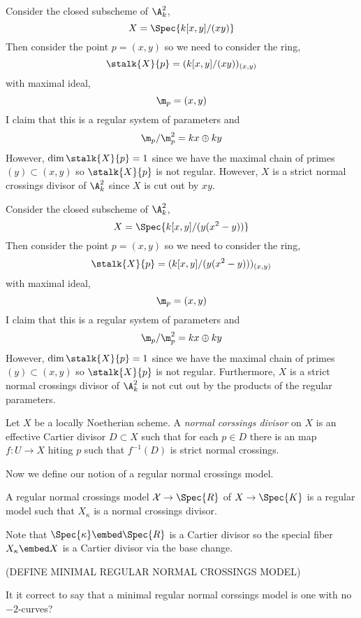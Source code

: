 \begin{example}
Consider the closed subscheme of $\A^2_k$,
\[ X = \Spec{k[x, y]/(xy)} \]
Then consider the point $p = (x, y)$ so we need to consider the ring,
\[ \stalk{X}{p} = (k[x, y]/(xy))_{(x, y)} \]
with maximal ideal,
\[ \m_p = (x, y) \]
I claim that this is a regular system of parameters and
\[ \m_p / \m_p^2 = k x \oplus k y \] 
However, $\dim{\stalk{X}{p}} = 1$ since we have the maximal chain of primes $(y) \subset (x, y)$ so $\stalk{X}{p}$ is not regular. However, $X$ is a strict normal crossings divisor of $\A^2_k$ since $X$ is cut out by $xy$. 
\end{example}

\begin{example}
Consider the closed subscheme of $\A^2_k$,
\[ X = \Spec{k[x, y]/(y(x^2 - y))} \]
Then consider the point $p = (x, y)$ so we need to consider the ring,
\[ \stalk{X}{p} = (k[x, y]/(y(x^2 - y)))_{(x, y)} \]
with maximal ideal,
\[ \m_p = (x, y) \]
I claim that this is a regular system of parameters and
\[ \m_p / \m_p^2 = k x \oplus k y \] 
However, $\dim{\stalk{X}{p}} = 1$ since we have the maximal chain of primes $(y) \subset (x, y)$ so $\stalk{X}{p}$ is not regular. Furthermore, $X$ is a strict normal crossings divisor of $\A^2_k$ is not cut out by the products of the regular parameters. 
\end{example}

\begin{defn}
Let $X$ be a locally Noetherian scheme. A \textit{normal corssings divisor} on $X$ is an effective Cartier divisor $D \subset X$ such that for each $p \in D$ there is an \etale map $f : U \to X$ hiting $p$ such that $f^{-1}(D)$ is strict normal crossings.
\end{defn}
\noindent
Now we define our notion of a regular normal crossings model.

\begin{defn}
A regular normal crossings model $\X \to \Spec{R}$ of $X \to \Spec{K}$ is a regular model such that $X_\kappa$ is a normal crossings divisor.
\end{defn}

\begin{rmk}
Note that $\Spec{\kappa} \embed \Spec{R}$ is a Cartier divisor so the special fiber $X_\kappa \embed X$ is a Cartier divisor via the base change.
\end{rmk}

(DEFINE MINIMAL REGULAR NORMAL CROSSINGS MODEL)

\begin{question}
It it correct to say that a minimal regular normal corssings model is one with no $-2$-curves?
\end{question}

